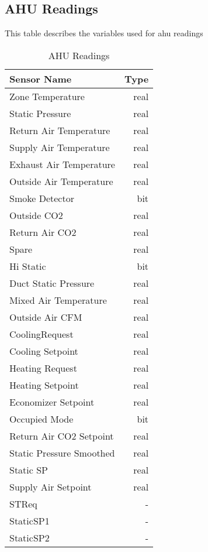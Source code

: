 \pagebreak

\subsection{AHU Readings}

This table describes the variables used for \gls{ahu} readings

\begin{table}[!htb]
\centering
\begin{tabular}{| l r |}
	\hline
	\textbf{Sensor Name}           & \textbf{Type} \\ 
  	\hline
  	Zone Temperature         & real      \\
Static Pressure          & real      \\
Return Air Temperature   & real      \\
Supply Air Temperature   & real      \\
Exhaust Air Temperature  & real      \\
Outside Air Temperature  & real      \\
Smoke Detector           & bit       \\
Outside CO2              & real      \\
Return Air CO2           & real      \\
Spare                    & real      \\
Hi Static                & bit       \\
Duct Static Pressure     & real      \\
Mixed Air Temperature    & real      \\
Outside Air CFM          & real      \\
CoolingRequest           & real      \\
Cooling Setpoint         & real      \\
Heating Request          & real      \\
Heating Setpoint         & real      \\
Economizer Setpoint      & real      \\
Occupied Mode            & bit       \\
Return Air CO2 Setpoint  & real      \\
Static Pressure Smoothed & real      \\
Static SP                & real      \\
Supply Air Setpoint      & real      \\
STReq                    & -         \\
StaticSP1                & -         \\
StaticSP2                & -        \\
  	\hline
\end{tabular}
\caption{AHU Readings}
\label{table:ahu_readings}
\end{table}


